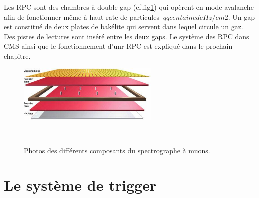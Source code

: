 \begin{itemize}[label=$\bullet$]
	Les RPC sont des chambres à double gap (cf.fig\ref{RPC2}) qui opèrent en mode avalanche afin de fonctionner même à haut rate de particules $~qq centaine de Hz/cm2$. Un gap est constitué de deux plates de bakélite qui servent  dans lequel circule un gaz. Des pistes de lectures sont inséré entre les deux gaps. Le système des RPC dans CMS ainsi que le fonctionnement d'unr RPC est expliqué dans le prochain chapitre.
	  \begin{figure}[ht!]
		\centering
		\includegraphics[width=0.60\textwidth]{CMS/RPC2.jpg}
		\label{RPC2}
	\end{figure}
	
	
\end{itemize}
    \begin{figure}[ht!]
	\centering
	\\
	\caption{Photos des différents composants du spectrographe à muons.}
\end{figure}

\section{Le système de trigger}